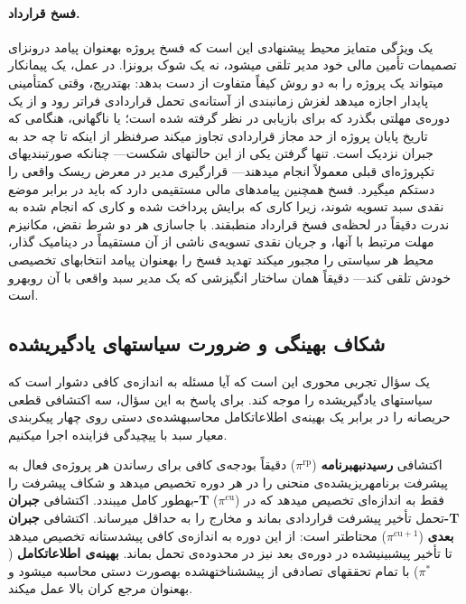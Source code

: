 \paragraph{فسخ قرارداد.}
یک ویژگی متمایز محیط پیشنهادی این است که فسخ پروژه
به\zwnj{}عنوان پیامد درون\zwnj{}زای تصمیمات تأمین مالی خود مدیر
تلقی می\zwnj{}شود، نه یک شوک برون\zwnj{}زا.
در عمل، یک پیمانکار می\zwnj{}تواند یک پروژه را به دو روش کیفاً متفاوت
از دست بدهد: به\zwnj{}تدریج، وقتی کم\zwnj{}تأمینی پایدار اجازه می\zwnj{}دهد
لغزش زمان\zwnj{}بندی از آستانه‌ی تحمل قراردادی فراتر رود
و از یک دوره‌ی مهلتی بگذرد که برای بازیابی در نظر گرفته شده است؛
یا ناگهانی، هنگامی که تاریخ پایان پروژه از حد مجاز قراردادی
تجاوز می\zwnj{}کند صرف\zwnj{}نظر از اینکه تا چه حد به جبران نزدیک است.
تنها گرفتن یکی از این حالت\zwnj{}های شکست---
چنانکه صورت\zwnj{}بندی\zwnj{}های تک\zwnj{}پروژه‌ای قبلی معمولاً انجام می\zwnj{}دهند---
قرارگیری مدیر در معرض ریسک واقعی را دست\zwnj{}کم می\zwnj{}گیرد.
فسخ همچنین پیامدهای مالی مستقیمی دارد که باید
در برابر موضع نقدی سبد تسویه شوند،
زیرا کاری که برایش پرداخت شده و کاری که انجام شده
به ندرت دقیقاً در لحظه‌ی فسخ قرارداد منطبقند.
با جاسازی هر دو شرط نقض، مکانیزم مهلت مرتبط با آن\zwnj{}ها،
و جریان نقدی تسویه‌ی ناشی از آن مستقیماً در دینامیک گذار،
محیط هر سیاستی را مجبور می\zwnj{}کند تهدید فسخ را
به\zwnj{}عنوان پیامد انتخاب\zwnj{}های تخصیصی خودش تلقی کند---
دقیقاً همان ساختار انگیزشی که یک مدیر سبد واقعی با آن روبه\zwnj{}رو است.

\subsection{شکاف بهینگی و ضرورت سیاست\zwnj{}های یادگیری\zwnj{}شده}
\label{subsec:gap}

یک سؤال تجربی محوری این است که آیا مسئله به اندازه‌ی کافی دشوار است
که سیاست\zwnj{}های یادگیری\zwnj{}شده را موجه کند.
برای پاسخ به این سؤال، سه اکتشافی قطعی حریصانه را
در برابر یک بهینه‌ی اطلاعات\zwnj{}کامل محاسبه\zwnj{}شده‌ی دستی
روی چهار پیکربندی معیار سبد با پیچیدگی فزاینده اجرا می\zwnj{}کنیم.

اکتشافی \textbf{رسیدن\zwnj{}به\zwnj{}برنامه} ($\pi^{\mathrm{rp}}$) دقیقاً
بودجه‌ی کافی برای رساندن هر پروژه‌ی فعال به پیشرفت برنامه\zwnj{}ریزی\zwnj{}شده‌ی
منحنی را در هر دوره تخصیص می\zwnj{}دهد و شکاف پیشرفت را
به\zwnj{}طور کامل می\zwnj{}بندد.
اکتشافی \textbf{جبران\zwnj{}-T} ($\pi^{\mathrm{cu}}$) فقط به اندازه‌ای
تخصیص می\zwnj{}دهد که در تحمل تأخیر پیشرفت قراردادی بماند
و مخارج را به حداقل می\zwnj{}رساند.
اکتشافی \textbf{جبران\zwnj{}-T بعدی} ($\pi^{\mathrm{cu}+1}$) محتاط\zwnj{}تر است:
از این دوره به اندازه‌ی کافی پیش\zwnj{}دستانه تخصیص می\zwnj{}دهد
تا تأخیر پیش\zwnj{}بینی\zwnj{}شده در دوره‌ی بعد نیز در محدوده‌ی تحمل بماند.
\textbf{بهینه‌ی اطلاعات\zwnj{}کامل} ($\pi^*$) با تمام تحقق\zwnj{}های تصادفی
از پیش\zwnj{}شناخته\zwnj{}شده به\zwnj{}صورت دستی محاسبه می\zwnj{}شود
و به\zwnj{}عنوان مرجع کران بالا عمل می\zwnj{}کند.

